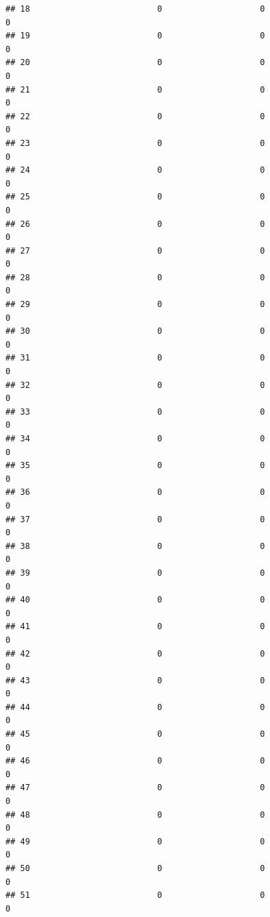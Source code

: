 \documentclass[
]{article}
\begin{document}
\begin{verbatim}
## 18                          0                    0                      0
## 19                          0                    0                      0
## 20                          0                    0                      0
## 21                          0                    0                      0
## 22                          0                    0                      0
## 23                          0                    0                      0
## 24                          0                    0                      0
## 25                          0                    0                      0
## 26                          0                    0                      0
## 27                          0                    0                      0
## 28                          0                    0                      0
## 29                          0                    0                      0
## 30                          0                    0                      0
## 31                          0                    0                      0
## 32                          0                    0                      0
## 33                          0                    0                      0
## 34                          0                    0                      0
## 35                          0                    0                      0
## 36                          0                    0                      0
## 37                          0                    0                      0
## 38                          0                    0                      0
## 39                          0                    0                      0
## 40                          0                    0                      0
## 41                          0                    0                      0
## 42                          0                    0                      0
## 43                          0                    0                      0
## 44                          0                    0                      0
## 45                          0                    0                      0
## 46                          0                    0                      0
## 47                          0                    0                      0
## 48                          0                    0                      0
## 49                          0                    0                      0
## 50                          0                    0                      0
## 51                          0                    0                      0

\end{verbatim}
\end{document}

